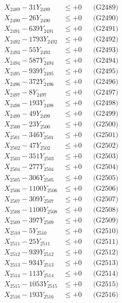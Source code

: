 \documentclass[a4paper,10pt]{article}
\begin{document}
{\begin{align}
X_{2489} - 31Y_{2489} &\leq +0 && \text{(G2489)} \\
X_{2490} - 26Y_{2490} &\leq +0 && \text{(G2490)} \\
\allowbreak
X_{2491} - 639Y_{2491} &\leq +0 && \text{(G2491)} \\
X_{2492} - 1793Y_{2492} &\leq +0 && \text{(G2492)} \\
X_{2493} - 55Y_{2493} &\leq +0 && \text{(G2493)} \\
X_{2494} - 587Y_{2494} &\leq +0 && \text{(G2494)} \\
X_{2495} - 939Y_{2495} &\leq +0 && \text{(G2495)} \\
X_{2496} - 372Y_{2496} &\leq +0 && \text{(G2496)} \\
X_{2497} - 8Y_{2497} &\leq +0 && \text{(G2497)} \\
X_{2498} - 193Y_{2498} &\leq +0 && \text{(G2498)} \\
X_{2499} - 49Y_{2499} &\leq +0 && \text{(G2499)} \\
X_{2500} - 23Y_{2500} &\leq +0 && \text{(G2500)} \\
\allowbreak
X_{2501} - 346Y_{2501} &\leq +0 && \text{(G2501)} \\
X_{2502} - 47Y_{2502} &\leq +0 && \text{(G2502)} \\
X_{2503} - 351Y_{2503} &\leq +0 && \text{(G2503)} \\
X_{2504} - 277Y_{2504} &\leq +0 && \text{(G2504)} \\
X_{2505} - 306Y_{2505} &\leq +0 && \text{(G2505)} \\
X_{2506} - 1100Y_{2506} &\leq +0 && \text{(G2506)} \\
X_{2507} - 309Y_{2507} &\leq +0 && \text{(G2507)} \\
X_{2508} - 1100Y_{2508} &\leq +0 && \text{(G2508)} \\
X_{2509} - 397Y_{2509} &\leq +0 && \text{(G2509)} \\
X_{2510} - 5Y_{2510} &\leq +0 && \text{(G2510)} \\
\allowbreak
X_{2511} - 25Y_{2511} &\leq +0 && \text{(G2511)} \\
X_{2512} - 939Y_{2512} &\leq +0 && \text{(G2512)} \\
X_{2513} - 934Y_{2513} &\leq +0 && \text{(G2513)} \\
X_{2514} - 113Y_{2514} &\leq +0 && \text{(G2514)} \\
X_{2515} - 1053Y_{2515} &\leq +0 && \text{(G2515)} \\
X_{2516} - 193Y_{2516} &\leq +0 && \text{(G2516)} \\

\end{align}}
\end{document}
